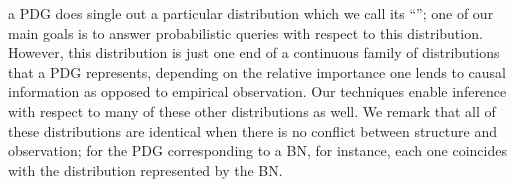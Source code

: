 {    %
    a PDG does single out a particular distribution which we call its ``\obslimit'';
    one of our main goals 
    is to answer probabilistic queries with respect to this distribution.
    However, 
    this distribution is just 
    one end 
    of a continuous family of distributions that a PDG represents,
    depending on the relative importance one lends to 
        causal information as opposed to empirical observation.
    Our techniques enable inference with respect to 
        many of these other distributions as well.
    We remark that all of these distributions are identical
    when there is no conflict between structure and observation;
    for the PDG corresponding to a BN, for instance, each one
    coincides with the distribution represented by the BN.
    }

